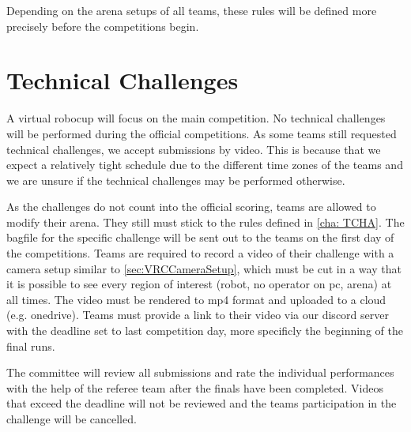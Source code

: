 Depending on the arena setups of all teams, these rules will be defined more precisely before the competitions begin.

\section{Technical Challenges} 
\label{sec:VRCTecCha}

A virtual robocup will focus on the main competition. No technical challenges will be performed during the official competitions. As some teams still requested technical challenges, we accept submissions by video. 
This is because that we expect a relatively tight schedule due to the different time zones of the teams and we are unsure if the technical challenges may be performed otherwise.

As the challenges do not count into the official scoring, teams are allowed to modify their arena. They still must stick to the rules defined in \ref{cha: TCHA}. The bagfile for the specific challenge will be sent out to the teams on the first day of the competitions. Teams are required to record a video of their challenge with a camera setup similar to \ref{sec:VRCCameraSetup}, which must be cut in a way that it is possible to see every region of interest (robot, no operator on pc, arena) at all times. The video must be rendered to mp4 format and uploaded to a cloud (e.g. onedrive). 
Teams must provide a link to their video via our discord server with the deadline set to last competition day, more specificly the beginning of the final runs.

The committee will review all submissions and rate the individual performances with the help of the referee team after the finals have been completed. Videos that exceed the deadline will not be reviewed and the teams participation in the challenge will be cancelled.











